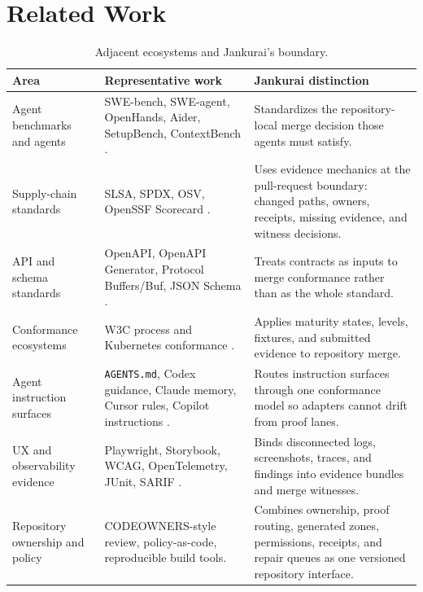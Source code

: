 \section{Related Work}

\begin{table}[t]
\caption{Adjacent ecosystems and Jankurai's boundary.}
\label{tab:related-work}
\centering
\scriptsize
\begin{tabularx}{\textwidth}{L{0.22\textwidth} Y Y}
\toprule
\textbf{Area} & \textbf{Representative work} & \textbf{Jankurai distinction} \\
\midrule
Agent benchmarks and agents & SWE-bench, SWE-agent, OpenHands, Aider, SetupBench, ContextBench \cite{sweBench2024,sweAgentAci2024,openhands2024,aiderGithub2026,setupBench2025,contextBench2026}. & Standardizes the repository-local merge decision those agents must satisfy. \\
Supply-chain standards & SLSA, SPDX, OSV, OpenSSF Scorecard \cite{slsaSpec2026,spdxSpecifications2026,osvScanner2026,openssfScorecard2026}. & Uses evidence mechanics at the pull-request boundary: changed paths, owners, receipts, missing evidence, and witness decisions. \\
API and schema standards & OpenAPI, OpenAPI Generator, Protocol Buffers/Buf, JSON Schema \cite{openapiSpecification2026,openapiGeneratorUsage2026,protobufOverview2026,bufDocs2026,jsonSchemaSpec2026}. & Treats contracts as inputs to merge conformance rather than as the whole standard. \\
Conformance ecosystems & W3C process and Kubernetes conformance \cite{w3cProcess2026,kubernetesConformance2026}. & Applies maturity states, levels, fixtures, and submitted evidence to repository merge. \\
Agent instruction surfaces & \texttt{AGENTS.md}, Codex guidance, Claude memory, Cursor rules, Copilot instructions \cite{agentsMdSpec2026,openaiCodexAgentsMd2026,claudeCodeMemoryDocs2026,cursorRulesDocs2026,githubCopilotInstructions2026}. & Routes instruction surfaces through one conformance model so adapters cannot drift from proof lanes. \\
UX and observability evidence & Playwright, Storybook, WCAG, OpenTelemetry, JUnit, SARIF \cite{playwrightBestPractices2026,playwrightVisualComparisons2026,storybookVisualTests2026,storybookAccessibility2026,wcagTargetSizeMinimum2026,openTelemetryDocs2025,sarifSpec2023}. & Binds disconnected logs, screenshots, traces, and findings into evidence bundles and merge witnesses. \\
Repository ownership and policy & CODEOWNERS-style review, policy-as-code, reproducible build tools. & Combines ownership, proof routing, generated zones, permissions, receipts, and repair queues as one versioned repository interface. \\
\bottomrule
\end{tabularx}
\end{table}

